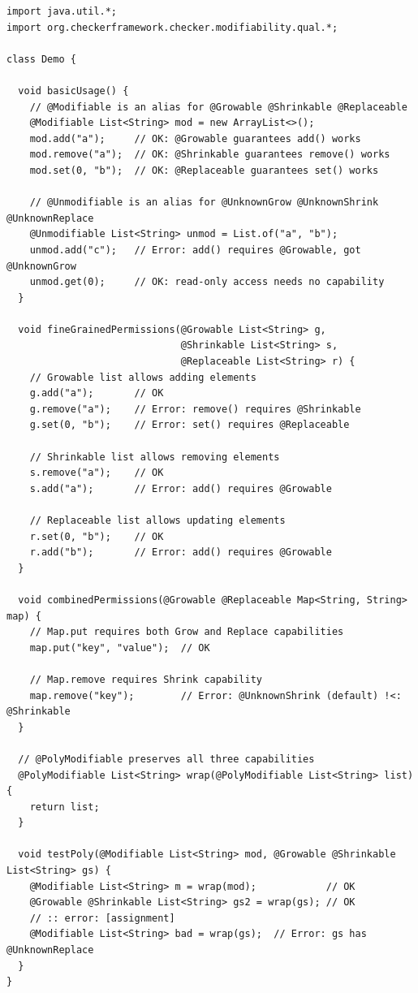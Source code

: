 \begin{Verbatim}
import java.util.*;
import org.checkerframework.checker.modifiability.qual.*;

class Demo {

  void basicUsage() {
    // @Modifiable is an alias for @Growable @Shrinkable @Replaceable
    @Modifiable List<String> mod = new ArrayList<>();
    mod.add("a");     // OK: @Growable guarantees add() works
    mod.remove("a");  // OK: @Shrinkable guarantees remove() works
    mod.set(0, "b");  // OK: @Replaceable guarantees set() works

    // @Unmodifiable is an alias for @UnknownGrow @UnknownShrink @UnknownReplace
    @Unmodifiable List<String> unmod = List.of("a", "b");
    unmod.add("c");   // Error: add() requires @Growable, got @UnknownGrow
    unmod.get(0);     // OK: read-only access needs no capability
  }

  void fineGrainedPermissions(@Growable List<String> g,
                              @Shrinkable List<String> s,
                              @Replaceable List<String> r) {
    // Growable list allows adding elements
    g.add("a");       // OK
    g.remove("a");    // Error: remove() requires @Shrinkable
    g.set(0, "b");    // Error: set() requires @Replaceable

    // Shrinkable list allows removing elements
    s.remove("a");    // OK
    s.add("a");       // Error: add() requires @Growable

    // Replaceable list allows updating elements
    r.set(0, "b");    // OK
    r.add("b");       // Error: add() requires @Growable
  }

  void combinedPermissions(@Growable @Replaceable Map<String, String> map) {
    // Map.put requires both Grow and Replace capabilities
    map.put("key", "value");  // OK

    // Map.remove requires Shrink capability
    map.remove("key");        // Error: @UnknownShrink (default) !<: @Shrinkable
  }

  // @PolyModifiable preserves all three capabilities
  @PolyModifiable List<String> wrap(@PolyModifiable List<String> list) {
    return list;
  }

  void testPoly(@Modifiable List<String> mod, @Growable @Shrinkable List<String> gs) {
    @Modifiable List<String> m = wrap(mod);            // OK
    @Growable @Shrinkable List<String> gs2 = wrap(gs); // OK
    // :: error: [assignment]
    @Modifiable List<String> bad = wrap(gs);  // Error: gs has @UnknownReplace
  }
}
\end{Verbatim}

